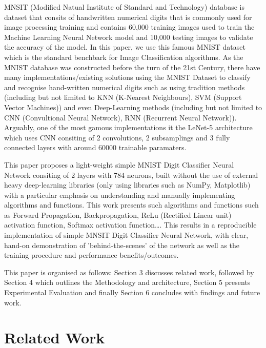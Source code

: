 \documentclass[11pt]{article}
\begin{document}
\vspace{1em}
MNSIT (Modified Natual Institute of Standard and Technology) database is dataset that consits of handwritten numerical digits that is commonly used for image processing training and contains 60,000 training images used to train the Machine Learning Neural Network model and 10,000 testing images to validate the accuracy of the model. In this paper, we use this famous MNIST dataset which is the standard benchbark for Image Classification algorithms. As the MNIST database was constructed before the turn of the 21st Century, there have many implementations/existing solutions using the MNIST Dataset to classify and recognise hand-written numerical digits such as using tradition methods (including but not limited to KNN (K-Nearest Neighbours), SVM (Support Vector Machines)) and even Deep-Learning methods (including but not limited to CNN (Convultional Neural Network), RNN (Recurrent Neural Network)). Arguably, one of the most gamous implementations it the LeNet-5 architecture which uses CNN consiting of 2 convolutions, 2 subsamplings and 3 fully connected layers with around 60000 trainable paramaters.

\vspace{1em}
This paper proposes a light-weight simple MNIST Digit Classifier Neural Network consiting of 2 layers with 784 neurons, built without the use of external heavy deep-learning libraries  (only using libraries such as NumPy, Matplotlib) with a particular emphasis on understanding and manually implementing algorithms and functions. This work presents such algorithms and functions such as Forward Propagation, Backpropagation, ReLu (Rectified Linear unit) activation function, Softmax activation function\dots. This results in a reproducible implementation of simple MNSIT Digit Classifier Neural Network, with clear, hand-on demonstration of 'behind-the-scenes' of the network as well as the training procedure and performance benefits/outcomes.

\vspace{1em}
This paper is organised as follows: Section 3 discusses related work, followed by Section 4 which outlines the Methodology and architecture, Section 5 presents Experimental Evaluation and finally Section 6 concludes with findings and future work.



\section{Related Work}
\end{document}
